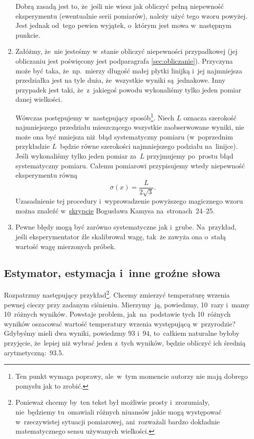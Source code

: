 \documentclass[a4paper,11pt]{article}
\begin{document}
\begin{enumerate}
  Dobrą zasadą jest to, że~jeśli nie wiesz jak obliczyć pełną
  niepewność eksperymentu (ewentualnie serii pomiarów), należy użyć
  tego wzoru powyżej. Jest jednak od~tego pewien wyjątek, o~którym
  jest mowa w~następnym punkcie.
\item Załóżmy, że~nie jesteśmy w~stanie obliczyć niepewności
  przypadkowej (jej obliczaniu jest poświęcony jest podparagrafa
  \eqref{sec:obliczanie}). Przyczyna może być taka, że~np.~mierzy
  długość małej płytki linijką i~jej najmniejsza przedziałka jest na
  tyle duża, że~wszystkie wyniki są~jednakowe. Inny przypadek jest
  taki, że~z~jakiegoś powodu wykonaliśmy tylko jeden pomiar danej
  wielkości.

  Wówczas postępujemy w~następujący sposób\footnote{Ten punkt wymaga
    poprawy, ale~w~tym momencie autorzy nie mają dobrego pomysłu jak
    to zrobić.}. Niech $L$ oznacza szerokość najmniejszego przedziału
  mieszczącego wszystkie zaobserwowane wyniki, nie może ona być
  mniejsza niż~błąd systematyczny pomiaru (w~poprzednim przykładzie
  $L$~będzie równe szerokości najmniejszego podziału na~linijce).
  Jeśli wykonaliśmy tylko jeden pomiar za~$L$ przyjmujemy po~prostu
  błąd systematyczny pomiaru. Całemu pomiarowi przypisujemy wtedy
  niepewność eksperymentu równą
  \begin{equation}
    \label{eq:2}
    \sigma( x ) = \frac{ L }{ 2 \sqrt{ 3 } }.
  \end{equation}
  Uzasadnienie tej procedury i~wyprowadzenie powyższego magicznego
  wzoru można znaleźć
  w~\href{http://users.uj.edu.pl/\~ufkamys/BK/smop1N\_h.pdf}{skrypcie}
  Bogusława Kamysa na~stronach~24--25.
\item Pewne błędy mogą być zarówno systematyczne jak i~grube.
  Na~przykład, jeśli eksperymentator źle skalibrował wagę, tak~że
  zawyża ona o~stałą wartość wagę mierzonych próbek.
\end{enumerate}





\subsection{Estymator, estymacja i~inne groźne słowa}
\label{sec:estymator}

Rozpatrzmy następujący przykład\footnote{Ponieważ chcemy by~ten tekst
  był możliwie prosty i~zrozumiały, nie~będziemy tu~omawiali różnych
  niuansów jakie mogą występować w~rzeczywistej sytuacji pomiarowej,
  ani~rozważali bardzo dokładnie matematycznego sensu używanych
  wielkości.}. Chcemy zmierzyć temperaturę wrzenia pewnej cieczy przy
zadanym ciśnieniu. Mierzymy~ją, powiedzmy, 10~razy i~mamy 10~różnych
wyników. Powstaje problem, jak~na~podstawie tych 10~różnych wyników
oszacować wartość temperatury wrzenia występującą w~przyrodzie?
Gdybyśmy mieli dwa wyniki, powiedzmy 93\textcelsius{}
i~94\textcelsius, to~całkiem naturalne byłoby przyjęcie, że~lepiej niż
wybrać jeden z~tych wyników, będzie obliczyć ich średnią
arytmetyczną:~93.5\textcelsius.
\end{document}
